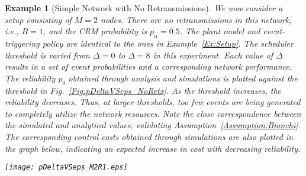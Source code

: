 \documentclass[journal]{IEEEtran}
\newtheorem{example}{Example}[section]
\begin{document}
\begin{example}[Simple Network with No Retransmissions] \label{Ex:NoRetx}
We now consider a setup consisting of $M=2$ nodes. There are no retransmissions in this network, i.e., $R=1$, and the CRM probability is $p_{\alpha}=0.5$. The plant model and event-triggering policy are identical to the ones in Example~\ref{Ex:Setup}. The scheduler threshold is varied from $\Delta = 0$ to $\Delta = 8$ in this experiment. Each value of $\Delta$ results in a set of event probabilities and a corresponding network performance. The reliability $p_\delta$ obtained through analysis and simulations is plotted against the threshold in Fig.~\ref{Fig:pDeltaVSeps_NoRetx}. As the threshold increases, the reliability decreases. Thus, at larger thresholds, too few events are being generated to completely utilize the network resources. Note the close correspondence between the simulated and analytical values, validating Assumption~\ref{Assumption:Bianchi}. The corresponding control costs obtained through simulations are also plotted in the graph below, indicating an expected increase in cost with decreasing reliability.

\begin{figure*}[tb]
\begin{center}
\texttt{[image: pDeltaVSeps\_M2R1.eps]}
\caption{A comparison of the analytical and simulated values of the reliability versus the event-triggering threshold, in a simple network with no retransmissions in the CRM. The close correspondence of these values validates Assumption~\ref{Assumption:Bianchi} and the results of Theorem~\ref{Theorem:SteadyStateAnalysis}.} \label{Fig:pDeltaVSeps_NoRetx}
\end{center}
\end{figure*}
\end{example}
\end{document}

